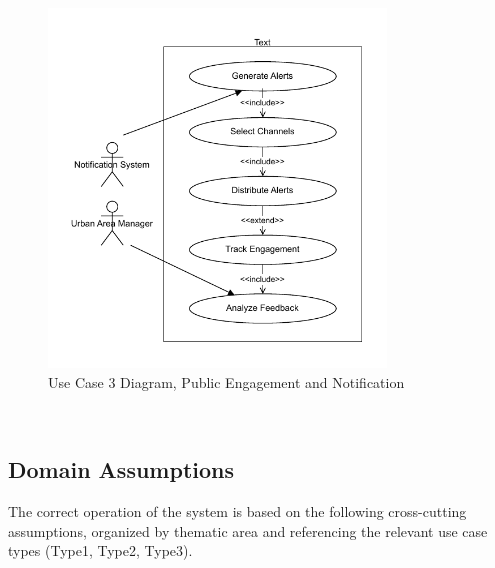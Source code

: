 \documentclass[a4paper,12pt]{article}
\begin{document}
\begin{figure}[h]
    \centering
    \includegraphics[width=0.8\textwidth]{diagrams/Public_Engagement_and_Notification.drawio.pdf}
    \caption{Use Case 3 Diagram, Public Engagement and Notification}
    \label{fig:Public_Engagement_and_Notification.drawio}
\end{figure}
\\

\newpage

\subsection{Domain Assumptions}

The correct operation of the system is based on the following cross-cutting assumptions, organized by thematic area and referencing the relevant use case types (Type1, Type2, Type3).
\end{document}
